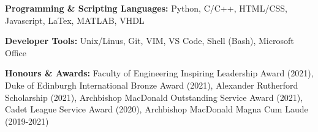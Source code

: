 

\begin{cvparagraph}


\textbf{Programming \& Scripting Languages:} Python, C/C++, HTML/CSS, Javascript, LaTex, MATLAB, VHDL 

\textbf{Developer Tools:} Unix/Linus, Git, VIM, VS Code, Shell (Bash), Microsoft Office

\textbf{Honours \& Awards:} Faculty of Engineering Inspiring Leadership Award (2021), Duke of Edinburgh International Bronze Award (2021), Alexander Rutherford Scholarship (2021), Archbishop MacDonald Outstanding Service Award (2021), Cadet League Service Award (2020), Archbishop MacDonald Magna Cum Laude (2019-2021)

\end{cvparagraph}
